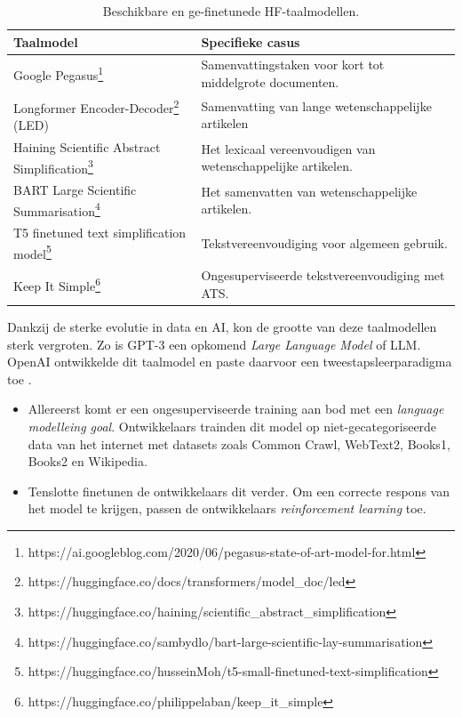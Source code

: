 \begin{center}
	\begin{table}[H]
	\begin{tabular}{ | m{4cm} | m{12cm} | } 
		\hline
		\textbf{Taalmodel} & \textbf{Specifieke casus} \\ \hline
		Google Pegasus\footnote{https://ai.googleblog.com/2020/06/pegasus-state-of-art-model-for.html} & Samenvattingstaken voor kort tot middelgrote documenten. \\
		\hline
		Longformer Encoder-Decoder\footnote{https://huggingface.co/docs/transformers/model_doc/led} (LED) & Samenvatting van lange wetenschappelijke artikelen \\
		\hline
		Haining Scientific Abstract Simplification\footnote{https://huggingface.co/haining/scientific_abstract_simplification} & Het lexicaal vereenvoudigen van wetenschappelijke artikelen. \\
		\hline
		BART Large Scientific Summarisation\footnote{https://huggingface.co/sambydlo/bart-large-scientific-lay-summarisation} & Het samenvatten van wetenschappelijke artikelen. \\
		\hline
		T5 finetuned text simplification model\footnote{https://huggingface.co/husseinMoh/t5-small-finetuned-text-simplification} & Tekstvereenvoudiging voor algemeen gebruik. \\
		\hline
		Keep It Simple\footnote{https://huggingface.co/philippelaban/keep_it_simple} & Ongesuperviseerde tekstvereenvoudiging met ATS. \\
		\hline
	\end{tabular}
		\caption{Beschikbare en ge-finetunede HF-taalmodellen.}
		\label{table:huggingface-models}
	\end{table}
\end{center}

\medspace

Dankzij de sterke evolutie in data en AI, kon de grootte van deze taalmodellen sterk vergroten. Zo is GPT-3 een opkomend \textit{Large Language Model} of LLM. OpenAI ontwikkelde dit taalmodel en paste daarvoor een tweestapsleerparadigma toe \autocite{Radford2019, Li2022}. 

\begin{itemize}
	\item Allereerst komt er een ongesuperviseerde training aan bod met een \textit{language modelleing goal}. Ontwikkelaars trainden dit model op niet-gecategoriseerde data van het internet met datasets zoals Common Crawl, WebText2, Books1, Books2 en Wikipedia.
	\item Tenslotte finetunen de ontwikkelaars dit verder. Om een correcte respons van het model te krijgen, passen de ontwikkelaars \textit{reinforcement learning} toe.
\end{itemize}

